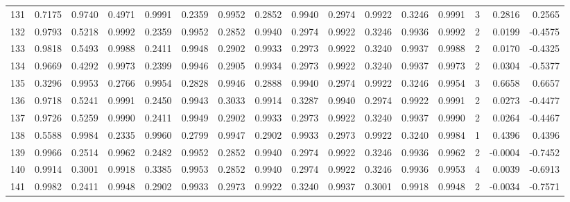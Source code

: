 \begin{tabular}{lrrrrrrrrrrrrrrr}
131 &      0.7175 &  0.9740 &  0.4971 &  0.9991 &  0.2359 &  0.9952 &  0.2852 &  0.9940 &  0.2974 &  0.9922 &   0.3246 &     0.9991 &      3 &                    0.2816 &                     0.2565 \\
132 &      0.9793 &  0.5218 &  0.9992 &  0.2359 &  0.9952 &  0.2852 &  0.9940 &  0.2974 &  0.9922 &  0.3246 &   0.9936 &     0.9992 &      2 &                    0.0199 &                    -0.4575 \\
133 &      0.9818 &  0.5493 &  0.9988 &  0.2411 &  0.9948 &  0.2902 &  0.9933 &  0.2973 &  0.9922 &  0.3240 &   0.9937 &     0.9988 &      2 &                    0.0170 &                    -0.4325 \\
134 &      0.9669 &  0.4292 &  0.9973 &  0.2399 &  0.9946 &  0.2905 &  0.9934 &  0.2973 &  0.9922 &  0.3240 &   0.9937 &     0.9973 &      2 &                    0.0304 &                    -0.5377 \\
135 &      0.3296 &  0.9953 &  0.2766 &  0.9954 &  0.2828 &  0.9946 &  0.2888 &  0.9940 &  0.2974 &  0.9922 &   0.3246 &     0.9954 &      3 &                    0.6658 &                     0.6657 \\
136 &      0.9718 &  0.5241 &  0.9991 &  0.2450 &  0.9943 &  0.3033 &  0.9914 &  0.3287 &  0.9940 &  0.2974 &   0.9922 &     0.9991 &      2 &                    0.0273 &                    -0.4477 \\
137 &      0.9726 &  0.5259 &  0.9990 &  0.2411 &  0.9949 &  0.2902 &  0.9933 &  0.2973 &  0.9922 &  0.3240 &   0.9937 &     0.9990 &      2 &                    0.0264 &                    -0.4467 \\
138 &      0.5588 &  0.9984 &  0.2335 &  0.9960 &  0.2799 &  0.9947 &  0.2902 &  0.9933 &  0.2973 &  0.9922 &   0.3240 &     0.9984 &      1 &                    0.4396 &                     0.4396 \\
139 &      0.9966 &  0.2514 &  0.9962 &  0.2482 &  0.9952 &  0.2852 &  0.9940 &  0.2974 &  0.9922 &  0.3246 &   0.9936 &     0.9962 &      2 &                   -0.0004 &                    -0.7452 \\
140 &      0.9914 &  0.3001 &  0.9918 &  0.3385 &  0.9953 &  0.2852 &  0.9940 &  0.2974 &  0.9922 &  0.3246 &   0.9936 &     0.9953 &      4 &                    0.0039 &                    -0.6913 \\
141 &      0.9982 &  0.2411 &  0.9948 &  0.2902 &  0.9933 &  0.2973 &  0.9922 &  0.3240 &  0.9937 &  0.3001 &   0.9918 &     0.9948 &      2 &                   -0.0034 &                    -0.7571 \\

\end{tabular}

